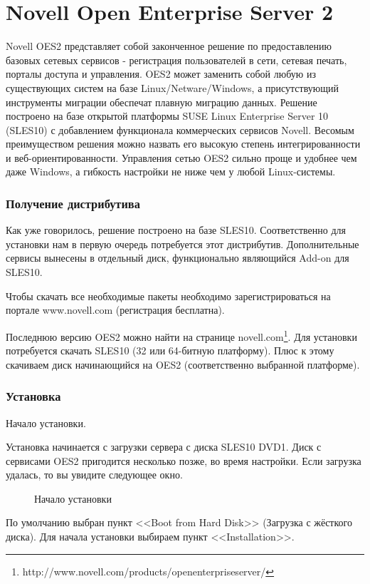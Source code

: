 \part{Novell Open Enterprise Server 2}
Novell OES2 представляет собой законченное решение по предоставлению базовых сетевых сервисов - регистрация пользователей в сети, сетевая печать, порталы доступа и управления. OES2 может заменить собой любую из существующих систем на базе Linux/Netware/Windows, а присутствующий инструменты миграции обеспечат плавную миграцию данных. Решение построено на базе открытой платформы SUSE Linux Enterprise Server 10 (SLES10) с добавлением функционала коммерческих сервисов Novell. Весомым преимуществом решения можно назвать его высокую степень интегрированности и веб-ориентированности. Управления сетью OES2 сильно проще и удобнее чем даже Windows, а гибкость настройки не ниже чем у любой Linux-системы.

\section{Получение дистрибутива}
Как уже говорилось, решение построено на базе SLES10. Соответственно для установки нам в первую очередь потребуется этот дистрибутив. Дополнительные сервисы вынесены в отдельный диск, функционально являющийся Add-on для SLES10.\par
Чтобы скачать все необходимые пакеты необходимо зарегистрироваться на портале www.novell.com (регистрация бесплатна).\par
Последнюю версию OES2 можно найти на странице novell.com\footnote{http://www.novell.com/products/openenterpriseserver/}. Для установки потребуется скачать SLES10 (32 или 64-битную платформу). Плюс к этому скачиваем диск начинающийся на OES2 (соответственно выбранной платформе).
\clearpage

\section{Установка}
Начало установки.\par
Установка начинается с загрузки сервера с диска SLES10 DVD1. Диск с сервисами OES2 пригодится несколько позже, во время настройки. Если загрузка удалась, то вы увидите следующее окно.
\begin{figure}[H]
\caption{Начало установки}
\label{fig1}
\end{figure}
По умолчанию выбран пункт <<Boot from Hard Disk>> (Загрузка с жёсткого диска). Для начала установки выбираем пункт <<Installation>>.
\clearpage

